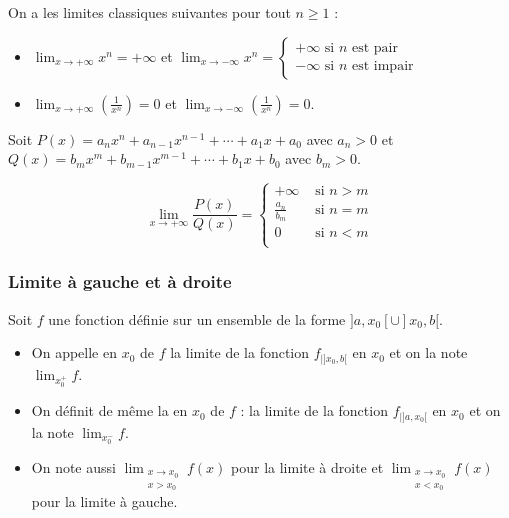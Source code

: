 \documentclass[class=report,crop=false]{standalone}
\begin{document}
\begin{exemple}
On a les limites classiques suivantes pour tout $n \ge 1$ :
\begin{itemize}
\item $\displaystyle\lim_{x\to +\infty} x^n = +\infty$ \quad et \quad
$\displaystyle\lim_{x\to -\infty} x^n =
\begin{cases}
+\infty \text{ si $n$ est pair}\\
-\infty \text{ si $n$ est impair}
\end{cases}$
\item $\displaystyle\lim_{x\to +\infty} \left(\frac{1}{x^n}\right) = 0$ \quad et
\quad $\displaystyle\lim_{x\to -\infty} \left(\frac{1}{x^n}\right) =0$.
\end{itemize}
\end{exemple}

\begin{exemple}
Soit $P(x)=a_nx^n+a_{n-1}x^{n-1}+\cdots+a_1x+a_0$  avec $a_n>0$
et $Q(x)=b_mx^m+b_{m-1}x^{m-1}+\cdots+b_1x+b_0$  avec $b_m>0$.

$$\lim_{x\to+\infty} \frac{P(x)}{Q(x)} =
\begin{cases}
  +\infty & \text{ si } n > m \\
  \frac{a_n}{b_m} & \text{ si } n = m \\
  0  & \text{ si } n < m \\
\end{cases}$$
\end{exemple}


\subsubsection{Limite à gauche et à droite}

Soit $f$ une fonction définie sur un ensemble de la forme $]a,x_0[\cup ]x_0,b[$.

\begin{definition}
\sauteligne
\begin{itemize}
  \item On appelle  en $x_0$ de $f$ la limite de la fonction
$f_{\big\vert ]x_0,b[}$ en $x_0$ et on la note $\displaystyle\lim_{x_0^+} f$.

  \item On définit de même la  en $x_0$ de $f$ : la limite de la fonction
$f_{\big\vert ]a,x_0[}$ en $x_0$ et on la note $\displaystyle\lim_{x_0^-} f$.

  \item On note aussi $\displaystyle\lim_{\substack{x\to x_0\\x>x_0}}f(x)$ pour la limite à droite
et $\displaystyle\lim_{\substack{x\to x_0\\x<x_0}}f(x)$ pour la limite à gauche.
\end{itemize}
\end{definition}
\end{document}
